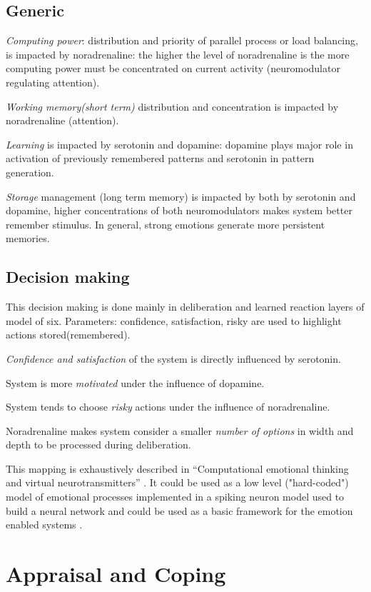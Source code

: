 \subsection{Generic}

\emph{Computing power}: distribution and priority of parallel process or load balancing, is impacted by noradrenaline: the higher the level of noradrenaline is the more computing power must be concentrated on current activity (neuromodulator regulating attention).

\emph{Working memory(short term)} distribution and concentration is impacted by noradrenaline (attention).

\emph{Learning} is impacted by serotonin and dopamine: dopamine plays major role in activation of previously remembered patterns and serotonin in pattern generation.

\emph{Storage} management (long term memory) is impacted by both by serotonin and dopamine, higher concentrations of both neuromodulators makes system better remember stimulus. In general, strong emotions generate more persistent memories.

\subsection{Decision making}

This decision making is done mainly in deliberation and learned reaction layers of model of six.
Parameters: confidence, satisfaction, risky are used to highlight actions stored(remembered).

\emph{Confidence and satisfaction} of the system is directly influenced by serotonin.

System is more \emph{motivated} under the influence of dopamine.

System tends to choose \emph{risky} actions under the influence of noradrenaline.

Noradrenaline makes system consider a smaller \emph{number of options} in width and depth to be processed during deliberation.

This mapping is exhaustively described in ``Computational emotional thinking and virtual neurotransmitters'' \cite{computational_emotional_thinking}. It could be used as a low level ("hard-coded") model of emotional processes implemented in a spiking neuron model used to build a neural network and could be used as a basic framework for the emotion enabled systems \cite{whatdoesitmeanforcomputer}.

\section{Appraisal and Coping}

